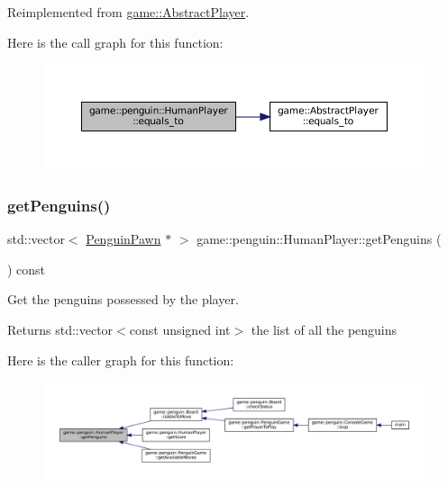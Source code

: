 Reimplemented from \hyperlink{classgame_1_1_abstract_player_adacb7220ee80c15058b9e2619bd9c72b}{game\+::\+Abstract\+Player}.

Here is the call graph for this function\+:
\nopagebreak
\begin{figure}[H]
\begin{center}
\leavevmode
\includegraphics[width=350pt]{classgame_1_1penguin_1_1_human_player_ad0f5548eee1fb7b866c592da4b529b69_cgraph}
\end{center}
\end{figure}
\mbox{\label{classgame_1_1penguin_1_1_human_player_a28c5485b12e0c8fcd340458255c06587}} 
\subsubsection{\texorpdfstring{get\+Penguins()}{getPenguins()}}
{\footnotesize\ttfamily std\+::vector$<$ \hyperlink{classgame_1_1penguin_1_1_penguin_pawn}{Penguin\+Pawn} $\ast$ $>$ game\+::penguin\+::\+Human\+Player\+::get\+Penguins (\begin{DoxyParamCaption}{ }\end{DoxyParamCaption}) const}



Get the penguins possessed by the player. 

\begin{DoxyReturn}{Returns}
std\+::vector$<$const unsigned int$>$ the list of all the penguins 
\end{DoxyReturn}
Here is the caller graph for this function\+:
\nopagebreak
\begin{figure}[H]
\begin{center}
\leavevmode
\includegraphics[width=350pt]{classgame_1_1penguin_1_1_human_player_a28c5485b12e0c8fcd340458255c06587_icgraph}
\end{center}
\end{figure}
\mbox{\label{classgame_1_1penguin_1_1_human_player_afe805f2359ba2c909c078a7fc3833ede}} 
